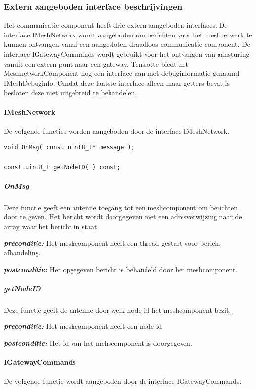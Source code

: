 \documentclass[a4paper, 11pt, oneside]{report}
\begin{document}
\subsubsection{Extern aangeboden interface beschrijvingen}
\label{DetailedDesign:CommunicatieComponentDiagram:interface:extern}
Het communicatie component heeft drie extern aangeboden interfaces. De interface IMeshNetwork wordt aangeboden om berichten voor het meshnetwerk te kunnen ontvangen vanaf een aangesloten draadloos communicatie component. De interface IGatewayCommands wordt gebruikt voor het ontvangen van aansturing vanuit een extern punt naar een gateway. Tenslotte biedt het MeshnetworkComponent nog een interface aan met debuginformatie genaamd IMeshDebuginfo. Omdat deze laatste interface alleen maar getters bevat is besloten deze niet uitgebreid te behandelen.

\paragraph{IMeshNetwork}
\label{DetailedDesign:CommunicatieComponentDiagram:interface:IMeshnetwork}
De volgende functies worden aangeboden door de interface IMeshNetwork. 

\begin{lstlisting}
void OnMsg( const uint8_t* message );

const uint8_t getNodeID( ) const;
\end{lstlisting}

\subparagraph{OnMsg}
Deze functie geeft een antenne toegang tot een meshcomponent om berichten door te geven. Het bericht wordt doorgegeven met een adresverwijzing naar de array waar het bericht in staat

\textbf{\textit{preconditie:}} Het meshcomponent heeft een thread gestart voor bericht afhandeling.

\textbf{\textit{postconditie:}} Het opgegeven bericht is behandeld door het meshcomponent.

\subparagraph{getNodeID}
Deze functie geeft de antenne door welk node id het meshcomponent bezit.

\textbf{\textit{preconditie:}} Het meshcomponent heeft een node id

\textbf{\textit{postconditie:}} Het id van het mehscomponent is doorgegeven.

\paragraph{IGatewayCommands }
\label{DetailedDesign:CommunicatieComponentDiagram:interface:IGatewayCommands}
De volgende functie wordt aangeboden door de interface IGatewayCommands. 
\end{document}
